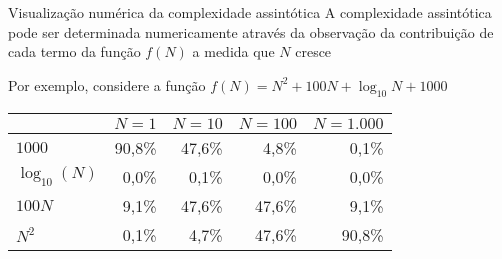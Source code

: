 \begin{frame}[fragile]{Visualização numérica da complexidade assintótica}
    A complexidade assintótica pode ser determinada numericamente através da observação da 
    contribuição de cada termo da função $f(N)$ a medida que $N$ cresce

    Por exemplo, considere a função $f(N) = N^2 + 100N + \log_{10} N + 1000 $

    \begin{table}[!ht]
        \centering
        \begin{tabular}{lrrrr}
        \toprule
            & $N = 1$ & $N = 10$ & $N = 100$ & $N = 1.000$ \\
        \midrule
        $1000$ & 90,8\% & 47,6\% & 4,8\% & 0,1\% \\
        \rowcolor[gray]{0.9}
        $\log_{10}(N)$ & 0,0\% & 0,1\% & 0,0\% & 0,0\% \\
        $100N$ & 9,1\% & 47,6\% & 47,6\% & 9,1\% \\ 
        \rowcolor[gray]{0.9}
        $N^2$ & 0,1\% & 4,7\% & 47,6\% & 90,8\% \\
        \bottomrule
        \end{tabular}
    \end{table}

\end{frame}
